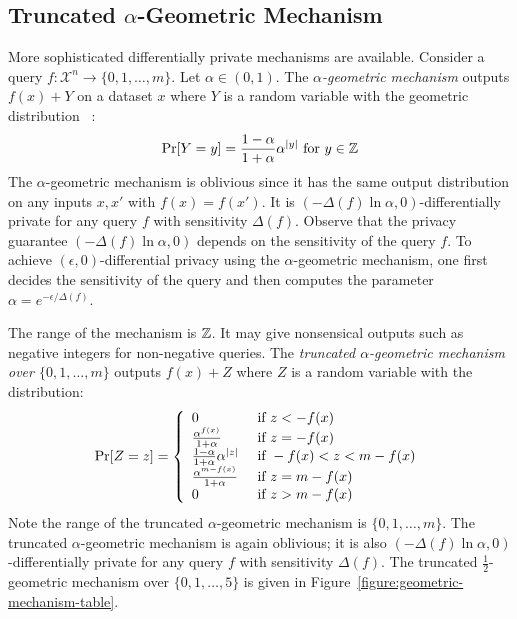 \subsection{Truncated $\alpha$-Geometric Mechanism}\label{subsec:geometric}
More sophisticated differentially private mechanisms are
available. Consider a query
$f : \mathcal{X}^n \rightarrow \{ 0, 1, \ldots, m \}$. Let $\alpha \in (0, 1)$.
The \emph{$\alpha$-geometric mechanism}
outputs $f(x) + Y$ on a dataset $x$ where $Y$ is a random variable with the geometric
distribution~\cite{GRS:09:UUPM,GRS:12:UUPM} :
\[
\Pr[Y = y] = \frac{1 - \alpha}{1 + \alpha}\alpha^{|y|}
\textmd{ for } y \in \mathbb{Z}
\]
The $\alpha$-geometric mechanism is oblivious since it has the same
output distribution on any inputs $x, x'$ with $f (x) = f
(x')$. It is $(- {\Delta (f)} \ln \alpha, 0)$-differentially
private for any query $f$ with sensitivity $\Delta (f)$. Observe that
the privacy guarantee $(-{\Delta (f)} \ln \alpha, 0)$ depends on the
sensitivity of the query $f$. To achieve $(\epsilon, 0)$-differential
privacy using the $\alpha$-geometric mechanism, one first decides the
sensitivity of the query and then computes the parameter $\alpha =
e^{-{\epsilon}/{{\Delta (f)}}}$. 

The range of the mechanism is $\mathbb{Z}$. It may give nonsensical
outputs such as negative integers for non-negative queries.
The \emph{truncated $\alpha$-geometric mechanism over $\{ 0, 1,
  \ldots, m \}$}
outputs $f (x) + Z$ where $Z$ is a random variable with the 
distribution:
\[
\Pr[Z = z] =
\left\{
  \begin{array}{ll}
    0 & \textmd{ if } z < - f (x) \\
    \frac{\alpha^{f (x)}}{1 + \alpha} & \textmd{ if } z = -f (x)\\
    \frac{1 - \alpha}{1 + \alpha}\alpha^{|z|} &
    \textmd{ if } -f (x) < z < m - f (x)\\
    \frac{\alpha^{m - f (x)}}{1 + \alpha} & \textmd{ if } z = m-f (x)\\
    0 & \textmd{ if } z > m - f (x)
  \end{array}
\right.
\]
Note the range of the truncated $\alpha$-geometric mechanism is
$\{ 0, 1, \ldots, m \}$. The truncated $\alpha$-geometric mechanism is
again oblivious; it is also $(- {\Delta (f)} \ln \alpha, 0)$-differentially
private for any query $f$ with sensitivity $\Delta (f)$.
The truncated $\frac{1}{2}$-geometric mechanism over $\{ 0, 1, \ldots, 5 \}$ is
given in Figure~\ref{figure:geometric-mechanism-table}.

